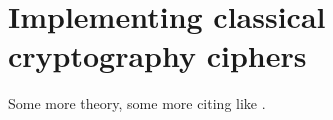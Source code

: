 
\section{Implementing classical cryptography ciphers}\label{sec:implementation}

Some more theory, some more citing like \cite{lamport1994latex}.